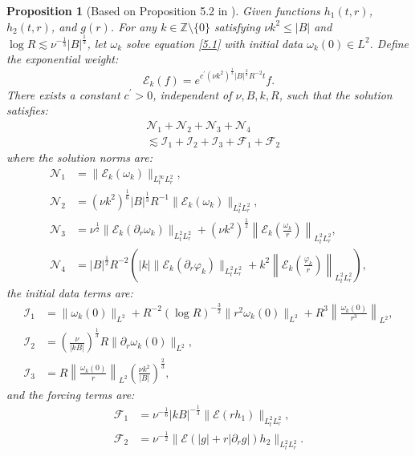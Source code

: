 \documentclass[final, 12pt,reqno]{amsart}
\newtheorem{proposition}[theorem]{\bf Proposition}
\numberwithin{equation}{section}
\begin{document}
\begin{proposition}[Based on Proposition 5.2 in \cite{An.2024}]\label{pro5.1}
Given functions $h_1(t,r)$, $h_2(t,r)$, and $g(r)$. For any $k \in \mathbb{Z}\setminus\{0\}$ satisfying $\nu k^2 \leq |B|$ and $\log R \lesssim \nu^{-\frac{1}{3}}|B|^{\frac{1}{3}}$, let $\omega_k$ solve equation \eqref{5.1} with initial data $\omega_k(0) \in L^2$. 
Define the exponential weight:
\[
\mathcal{E}_k(f) = e^{c^{\prime}(\nu k^2)^{\frac{1}{3}}|B|^{\frac{2}{3}} R^{-2} t}f.
\]
There exists a constant $c^{\prime}>0$, independent of $\nu, B, k, R$, such that the solution satisfies:
\begin{align*}
&\mathcal{N}_1 + \mathcal{N}_2 + \mathcal{N}_3 + \mathcal{N}_4 \\
&\lesssim \mathcal{I}_1 + \mathcal{I}_2 + \mathcal{I}_3 + \mathcal{F}_1 + \mathcal{F}_2
\end{align*}
where the solution norms are:
\begin{align*}
\mathcal{N}_1 &= \|\mathcal{E}_ k(\omega_k)\|_{L^\infty_t L^2_r}, \\
\mathcal{N}_2 &= (\nu k^2)^{\frac{1}{6}}|B|^{\frac{1}{3}} R^{-1}\|\mathcal{E}_k(\omega_k)\|_{L^2_t L^2_r}, \\
\mathcal{N}_3 &= \nu^{\frac{1}{2}}\|\mathcal{E}_k(\partial_r \omega_k)\|_{L^2_t L^2_r} + (\nu k^2)^{\frac{1}{2}}\left\|\mathcal{E}_k(\frac{\omega_k}{r})\right\|_{L^2_t L^2_r}, \\
\mathcal{N}_4 &= |B|^{\frac{1}{2}} R^{-2}\left(|k|\|\mathcal{E}_k(\partial_r \varphi_k)\|_{L^2_t L^2_r} + k^2\left\|\mathcal{E}_k(\frac{\varphi_k}{r})\right\|_{L^2_t L^2_r}\right),
\end{align*}
the initial data terms are:
\begin{align*}
\mathcal{I}_1 &= \|\omega_k(0)\|_{L^2} + R^{-2}(\log R)^{-\frac{3}{2}}\|r^2 \omega_k(0)\|_{L^2} + R^3\left\|\frac{\omega_k(0)}{r^3}\right\|_{L^2}, \\
\mathcal{I}_2 &= \left(\frac{\nu}{|k B|}\right)^{\frac{1}{3}} R \|\partial_r \omega_k(0)\|_{L^2}, \\
\mathcal{I}_3 &= R\left\|\frac{\omega_k(0)}{r}\right\|_{L^2}\left(\frac{\nu k^2}{|B|}\right)^{\frac{2}{3}},
\end{align*}
and the forcing terms are:
\begin{align*}
\mathcal{F}_1 &= \nu^{-\frac{1}{6}}|k B|^{-\frac{1}{3}}\|\mathcal{E} (r h_1)\|_{L^2_t L^2_r}, \\
\mathcal{F}_2 &= \nu^{-\frac{1}{2}}\|\mathcal{E} (|g| + r|\partial_r g|) h_2 \|_{L^2_t L^2_r}.
\end{align*}
\end{proposition}
\end{document}
